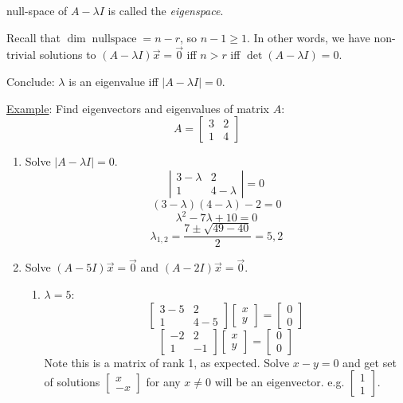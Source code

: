 \documentclass{article}
\newcommand{\tmem}[1]{{\em #1\/}}
\newcommand{\tmop}[1]{\ensuremath{\operatorname{#1}}}
\begin{document}
null-space of $A - \lambda I$ is called the {\tmem{eigenspace}}.

Recall that $\dim \tmop{nullspace} = n - r$, so $n - 1 \geq 1$. In other
words, we have non-trivial solutions to $(A - \lambda I)  \vec{x} = \vec{0}$
iff $n > r$ iff $\det (A - \lambda I) = 0$.

Conclude: $\lambda$ is an eigenvalue iff $| A - \lambda I | = 0$.

{\underline{Example}}: Find eigenvectors and eigenvalues of matrix $A$:
\[ A = \left[\begin{array}{cc}
     3 & 2\\
     1 & 4
   \end{array}\right] \]
\begin{enumerate}
  \item Solve $| A - \lambda I | = 0$.
  \[ \left|\begin{array}{cc}
       3 - \lambda & 2\\
       1 & 4 - \lambda
     \end{array}\right| = 0 \]
  \[ (3 - \lambda)  (4 - \lambda) - 2 = 0 \]
  \[ \lambda^2 - 7 \lambda + 10 = 0 \]
  \[ \lambda_{1, 2} = \frac{7 \pm \sqrt{49 - 40}}{2} = 5, 2 \]
  \item Solve $(A - 5 I)  \vec{x} = \vec{0}$ and $(A - 2 I)  \vec{x} =
  \vec{0}$.
  \begin{enumerate}
    \item $\lambda = 5$:
    \[ \left[\begin{array}{cc}
         3 - 5 & 2\\
         1 & 4 - 5
       \end{array}\right]  \left[\begin{array}{c}
         x\\
         y
       \end{array}\right] = \left[\begin{array}{c}
         0\\
         0
       \end{array}\right] \]
    \[ \left[\begin{array}{cc}
         - 2 & 2\\
         1 & - 1
       \end{array}\right]  \left[\begin{array}{c}
         x\\
         y
       \end{array}\right] = \left[\begin{array}{c}
         0\\
         0
       \end{array}\right] \]
    Note this is a matrix of rank 1, as expected. Solve $x - y = 0$ and get
    set of solutions $\left[\begin{array}{c}
      x\\
      - x
    \end{array}\right]$ for any $x \neq 0$ will be an eigenvector. e.g.
    $\left[\begin{array}{c}
      1\\
      1
    \end{array}\right]$.
    

\end{enumerate}
\end{enumerate}
\end{document}
